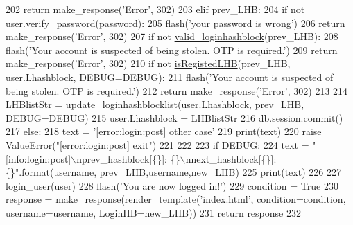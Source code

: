 \begin{DoxyCode}
202                 \textcolor{keywordflow}{return} make\_response(\textcolor{stringliteral}{'Error'}, 302)
203         \textcolor{keywordflow}{elif} prev\_LHB:
204             \textcolor{keywordflow}{if} \textcolor{keywordflow}{not} user.verify\_password(password):
205                 flash(\textcolor{stringliteral}{'your password is wrong'})
206                 \textcolor{keywordflow}{return} make\_response(\textcolor{stringliteral}{'Error'}, 302)
207             \textcolor{keywordflow}{if} \textcolor{keywordflow}{not} \hyperlink{namespaceloginhashblock_ac120dd8384bd51c357e2ad5f6cb2f99a}{valid\_loginhashblock}(prev\_LHB):
208                 flash(\textcolor{stringliteral}{'Your account is suspected of being stolen. OTP is required.'})
209                 \textcolor{keywordflow}{return} make\_response(\textcolor{stringliteral}{'Error'}, 302)
210             \textcolor{keywordflow}{if} \textcolor{keywordflow}{not} \hyperlink{namespaceloginhashblock_a978cb4557443cefddac883f3d92ad8e1}{isRegistedLHB}(prev\_LHB, user.Lhashblock, DEBUG=DEBUG):
211                 flash(\textcolor{stringliteral}{'Your account is suspected of being stolen. OTP is required.'})
212                 \textcolor{keywordflow}{return} make\_response(\textcolor{stringliteral}{'Error'}, 302)
213 
214             LHBlistStr = \hyperlink{namespaceloginhashblock_a7baa4021b9f57044f8227c2e0320ee2b}{update\_loginhashblocklist}(user.Lhashblock, prev\_LHB, 
      DEBUG=DEBUG)
215             user.Lhashblock = LHBlistStr
216             db.session.commit()
217         \textcolor{keywordflow}{else}:
218             text = \textcolor{stringliteral}{'[error:login:post] other case'}
219             print(text)
220             \textcolor{keywordflow}{raise} ValueError(\textcolor{stringliteral}{"[error:login:post] exit"})
221 
222 
223         \textcolor{keywordflow}{if} DEBUG:
224             text = \textcolor{stringliteral}{"[info:login:post]\(\backslash\)nprev\_hashblock[\{\}]: \{\}\(\backslash\)nnext\_hashblock[\{\}]: \{\}"}.format(username,
      prev\_LHB,username,new\_LHB)
225             print(text)
226 
227         login\_user(user)
228         flash(\textcolor{stringliteral}{'You are now logged in!'})
229         condition = \textcolor{keyword}{True}
230         response = make\_response(render\_template(\textcolor{stringliteral}{'index.html'}, condition=condition, username=username, 
      LoginHB=new\_LHB))
231         \textcolor{keywordflow}{return} response
232 
\end{DoxyCode}


